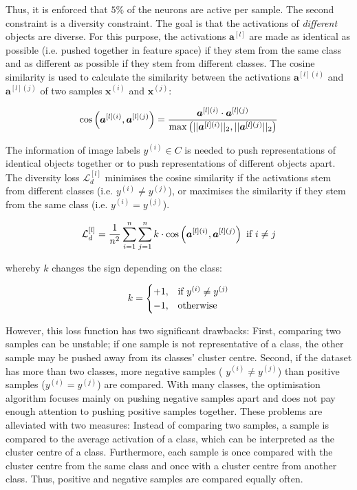 Thus, it is enforced that $5\%$ of the neurons are active per sample.
The second constraint is a diversity constraint. The goal is that the activations of \emph{different} objects are diverse. For this purpose, the activations $\boldsymbol{a}^{[l]}$ are made as identical as possible (i.e. pushed together in feature space) if they stem from the same class and as different as possible if they stem from different classes.
The cosine similarity is used to calculate the similarity between the activations $\boldsymbol{a}^{[l](i)}$ and $\boldsymbol{a}^{[l](j)}$ of two samples $\boldsymbol{x}^{(i)}$ and $\boldsymbol{x}^{(j)}$:

\begin{align}\eqlbl{vso_5}
		\text{cos}\left( \boldsymbol{a}^{[l](i)}, \boldsymbol{a}^{[l](j)} \right) = \frac{\boldsymbol{a}^{[l](i)} \cdot \boldsymbol{a}^{[l](j)}}{\max \left( ||\boldsymbol{a}^{[l](i)}||_2, ||\boldsymbol{a}^{[l](j)}||_2 \right)}
\end{align}

The information of image labels $y^{(i)} \in C$ is needed to push representations of identical objects together or to push representations of different objects apart.
The diversity loss $\mathcal{L}^{[l]}_d$ minimises the cosine similarity if the activations stem from different classes (i.e. $y^{(i)} \neq y^{(j)}$), or maximises the similarity if they stem from the same class (i.e. $y^{(i)} = y^{(j)}$).

\begin{align}\eqlbl{vso_6}
		\mathcal{L}^{[l]}_{d} = \frac{1}{n^2} \sum_{i=1}^{n} \sum_{j=1}^{n} k \cdot \text{cos} \left( \boldsymbol{a}^{[l](i)}, \boldsymbol{a}^{[l](j)} \right) \text{ if } i \neq j
\end{align}

whereby $k$ changes the sign depending on the class:

\begin{align}\eqlbl{vso_7}
		k = \begin{cases}
      		+1, & \text{if}\ y^{(i)} \neq y^{(j)} \\
      		-1, & \text{otherwise}
    	\end{cases}
\end{align}


However, this loss function has two significant drawbacks: First, comparing two samples can be unstable; if one sample is not representative of a class, the other sample may be pushed away from its classes' cluster centre. Second, if the dataset has more than two classes, more negative samples ( $y^{(i)} \neq y^{(j)}$) than positive samples ($y^{(i)} = y^{(j)}$) are compared. With many classes, the optimisation algorithm focuses mainly on pushing negative samples apart and does not pay enough attention to pushing positive samples together. These problems are alleviated with two measures: Instead of comparing two samples, a sample is compared to the average activation of a class, which can be interpreted as the cluster centre of a class. Furthermore, each sample is once compared with the cluster centre from the same class and once with a cluster centre from another class. Thus, positive and negative samples are compared equally often.

